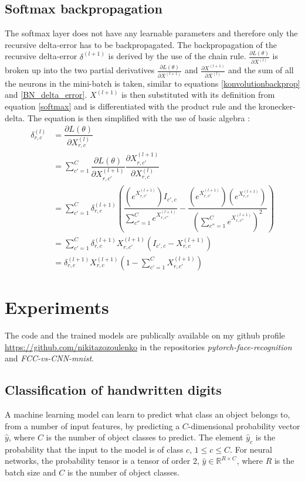 \documentclass[a4paper, twoside]{article}
\newcommand*{\pd}[2]{\ensuremath{\dfrac{\partial #1}{\partial #2}}}
\newcommand*{\inpd}[2]{\ensuremath{\frac{\partial #1}{\partial #2}}}
\begin{document}
\subsection{Softmax backpropagation}
The softmax layer does not have any learnable parameters and therefore only the recursive delta-error has to be backpropagated. The backpropagation of the recursive delta-error $\delta^{(l+1)}$ is derived by the use of the chain rule. $\inpd{L(\theta)}{X^{(l)}}$ is broken up into the two partial derivatives $\inpd{L(\theta)}{X^{(l+1)}}$ and $\inpd{X^{(l+1)}}{X^{(l)}}$ and the sum of all the neurons in the mini-batch is taken, similar to equations \eqref{konvolutionbackprop} and \eqref{BN_delta_error}. $X^{(l+1)}$ is then substituted with its definition from equation \eqref{softmax} and is differentiated with the product rule and the kronecker-delta. The equation is then simplified with the use of basic algebra \cite{cs231n} \cite{notesonbackprop} \cite{websoftmax}: 
\begin{equation}
\begin{split}
\delta^{(l)}_{r,c}
		& = \pd{L(\theta)}{X^{(l)}_{r,c}} \\
		& = \sum^{C }_{c'=1} \pd{L(\theta)}{X^{(l+1)}_{r,c'}} \pd{X^{(l+1)}_{r,c'}}{X^{(l)}_{r,c}} \\
		& = \sum^{C }_{c'=1} \delta^{(l+1)}_{r,c} \left(  \dfrac{(e^{X^{(l+1)}_{r,c'}})I_{c',c}}{\sum^{C }_{c''=1}e^{X^{(l+1)}_{r,c''}}} - \dfrac{(e^{X^{(l+1)}_{r,c'}})(e^{X^{(l+1)}_{r,c}})}{(\sum^{C }_{c''=1}e^{X^{(l+1)}_{r,c''}})^2} \right) \\
		& = \sum^{C }_{c'=1}  \delta^{(l+1)}_{r,c} X^{(l+1)}_{r,c'}(I_{c',c}-X^{(l+1)}_{r,c}) \\
		& = \delta^{(l+1)}_{r,c} X^{(l+1)}_{r,c} \left( 1-\sum^{C }_{c'=1} X^{(l+1)}_{r,c'} \right)
\end{split}
\end{equation}

\section{Experiments}
The code and the trained models are publically available on my github profile \url{https://github.com/nikitazozoulenko} in the repositories \textit{pytorch-face-recognition} and \textit{FCC-vs-CNN-mnist}.

\subsection{Classification of handwritten digits}
A machine learning model can learn to predict what class an object belongs to, from a number of input features, by predicting a $C$-dimensional probability vector $\hat{y}$, where $C$ is the number of object classes to predict. The element $\hat{y}_c$ is the probability that the input to the model is of class $c$, $1 \leq c \leq C$. For neural networks, the probability tensor is a tensor of order 2, $\hat{y} \in \mathbb{R}^{R \times C}$, where $R$ is the batch size and $C$ is the number of object classes.
\end{document}

